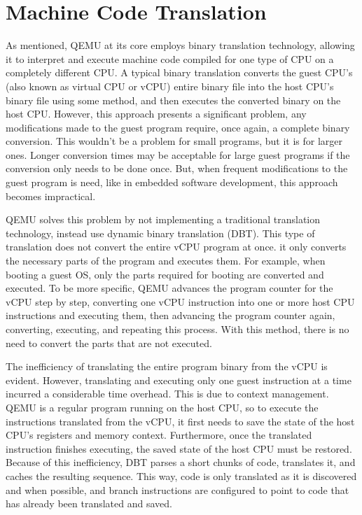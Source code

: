 \section{Machine Code Translation}
\label{chap:QEMU_Translation}

As mentioned, QEMU at its core employs binary translation technology, allowing 
it to interpret and execute machine code compiled for one type of CPU on a 
completely different CPU. A typical binary translation converts the guest CPU's 
(also known as virtual CPU or vCPU) entire binary file into the host CPU's binary file 
using some method, and then executes the converted binary on the host CPU. 
However, this approach presents a significant problem, any modifications made to the 
guest program require, once again, a complete binary conversion. This wouldn't be 
a problem for small programs, but it is for larger ones. Longer conversion times may 
be acceptable for large guest programs if the conversion only needs to be done once. 
But, when frequent modifications to the guest program is need, like in embedded 
software development, this approach becomes impractical.

QEMU solves this problem by not implementing a traditional translation 
technology, instead use dynamic binary translation (DBT). This type of translation 
does not convert the entire vCPU program at once. it only converts the necessary parts 
of the program and executes them. For example, when booting a guest OS, only 
the parts required for booting are converted and executed. To be more specific, 
QEMU advances the program counter for the vCPU step by step, converting one 
vCPU instruction into one or more host CPU instructions and executing them, 
then advancing the program counter again, converting, executing, and repeating 
this process. With this method, there is no need to convert the parts that are 
not executed.

The inefficiency of translating the entire program binary from the vCPU is evident. 
However, translating and executing only one guest instruction at a time 
incurred a considerable time overhead. This is due to context management. 
QEMU is a regular program running on the host CPU, so to execute the instructions 
translated from the vCPU, it first needs to save the state of the host CPU's registers and 
memory context. Furthermore, once the translated instruction finishes executing, 
the saved state of the host CPU must be restored. Because of this inefficiency, 
DBT parses a short chunks of code, translates it, and caches the resulting sequence. 
This way, code is only translated as it is discovered and when possible, and branch 
instructions are configured to point to code that has already been translated and saved.




